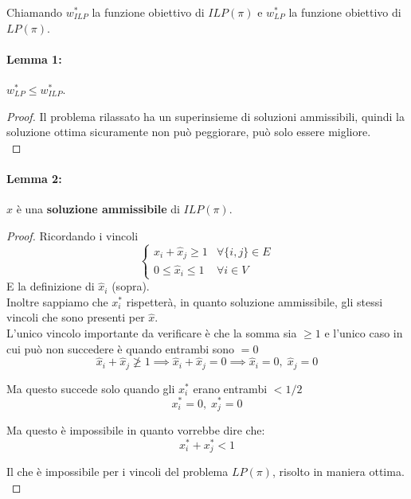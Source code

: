 Chiamando $w^\ast_{ILP}$ la funzione obiettivo di $ILP(\pi)$ e $w^\ast_{LP}$ la funzione obiettivo di $LP(\pi)$.\\

\paragraph{Lemma 1:} $w^\ast_{LP} \leq w^\ast_{ILP}$.\\

\begin{proof}
	Il problema rilassato ha un superinsieme di soluzioni ammissibili, quindi la soluzione ottima sicuramente non può peggiorare, può solo essere migliore.\\
\end{proof}

\paragraph{Lemma 2:} $\hat{x}$ è una \textbf{soluzione ammissibile} di $ILP(\pi)$.\\

\begin{proof}
	Ricordando i vincoli
	$$\begin{cases}
		\hat{x}_i + \hat{x}_j \geq 1 & \forall \{i,j\} \in E \\
		0 \leq \hat{x}_i \leq 1 & \forall i \in V
	\end{cases}
	$$
	E la definizione di $\hat{x}_i$ (sopra).\\
	
	Inoltre sappiamo che $x^\ast_i$ rispetterà, in quanto soluzione ammissibile, gli stessi vincoli che sono presenti per $\hat{x}$.\\
	
	L'unico vincolo importante da verificare è che la somma sia $\geq 1$ e l'unico caso in cui può non succedere è quando entrambi sono $=0$ 
	$$ \hat{x}_i + \hat{x}_j \ngeq 1 \implies \hat{x}_i + \hat{x}_j = 0 \implies \hat{x}_i = 0, \; \hat{x}_j = 0  $$
	
	Ma questo succede solo quando gli $x_i^\ast$ erano entrambi $< 1/2$
	$$ x_i^\ast = 0, \; x_j^\ast = 0$$
	
	Ma questo è impossibile in quanto vorrebbe dire che:
	$$ x_i^\ast + x_j^\ast < 1 $$
	
	Il che è impossibile per i vincoli del problema $LP(\pi)$, risolto in maniera ottima.\\
\end{proof}

